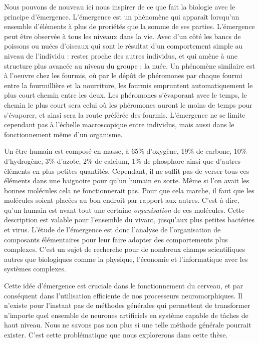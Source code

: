 	Nous pouvons de nouveau ici nous inspirer de ce que fait la biologie avec le principe d'émergence. L'émergence est un phénomène qui apparaît lorsqu'un ensemble d'éléments à plus de proriétés que la somme de ses parties. L'émergence peut être observée à tous les niveaux dans la vie. Avec d'un côté les bancs de poissons ou nuées d'oiseaux qui sont le résultat d'un comportement simple au niveau de l'individu : rester proche des autres individus, et qui amène à une structure plus avancée au niveau du groupe : la nuée. Un phénomène similaire est à l'oeuvre chez les fourmis, où par le dépôt de phéromones par chaque fourmi entre la fourmillière et la nourriture, les fourmis empruntent automatiquement le plus court chemin entre les deux. Les phéromones s'évaporant avec le temps, le chemin le plus court sera celui où les phéromones auront le moins de temps pour s'évaporer, et ainsi sera la route préférée des fourmis. L'émergence ne se limite cependant pas à l'échelle macroscopique entre individus, mais aussi dans le fonctionnement même d'un organisme.

	Un être humain est composé en masse, à 65\% d'oxygène, 19\% de carbone, 10\% d'hydrogène, 3\% d'azote, 2\% de calcium, 1\% de phosphore ainsi que d'autres éléments en plus petites quantités. Cependant, il ne suffit pas de verser tous ces éléments dans une baignoire pour qu'un humain en sorte. Même si l'on avait les bonnes molécules cela ne fonctionnerait pas. Pour que cela marche, il faut que les molécules soient placées au bon endroit par rapport aux autres. C'est à dire, qu'un humain est avant tout une certaine \textit{organisation} de ces molécules. Cette description est valable pour l'ensemble du vivant, jusqu'aux plus petites bactéries et virus. L'étude de l'émergence est donc l'analyse de l'organisation de composants élémentaires pour leur faire adopter des comportements plus complexes. C'est un sujet de recherche pour de nombreux champs scientifiques autres que biologiques comme la physique, l'économie et l'informatique avec les systèmes complexes.

	Cette idée d'émergence est cruciale dans le fonctionnement du cerveau, et par conséquent dans l'utilisation efficiente de nos processeurs neuromorphiques. Il n'existe pour l'instant pas de méthodes générales qui permettent de transformer n'importe quel ensemble de neurones artificiels en système capable de tâches de haut niveau. Nous ne savons pas non plus si une telle méthode générale pourrait exister. C'est cette problématique que nous explorerons dans cette thèse.

